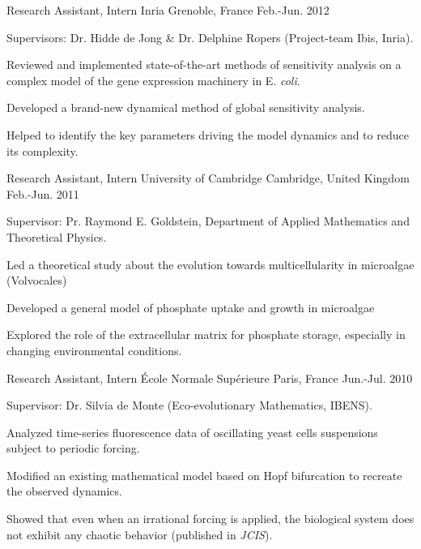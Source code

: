 
\begin{cventries}
  \cventry
    {Research Assistant, Intern} %
    {Inria} %
    {Grenoble, France} %
    {Feb.-Jun. 2012} %
    {
    Supervisors: Dr. Hidde de Jong \& Dr. Delphine Ropers (Project-team Ibis, Inria).
    \vspace{0.5cm}
	\begin{cvitems} %
		\item {Reviewed and implemented state-of-the-art methods of sensitivity analysis on a complex model of the gene expression machinery in E. \textit{coli}.}
		\item {Developed a brand-new dynamical method of global sensitivity analysis.}
		\item {Helped to identify the key parameters driving the model dynamics and to reduce its complexity.}
	\end{cvitems}
    }
    
  \cventry
    {Research Assistant, Intern} %
    {University of Cambridge} %
    {Cambridge, United Kingdom} %
    {Feb.-Jun. 2011} %
    {
	Supervisor: Pr. Raymond E. Goldstein, Department of Applied Mathematics and Theoretical Physics.
    \vspace{0.5cm}
	\begin{cvitems} %
		\item {Led a theoretical study about the evolution towards multicellularity in microalgae (Volvocales)}
		\item {Developed a general model of phosphate uptake and growth in microalgae}
		\item {Explored the role of the extracellular matrix for phosphate storage, especially in changing environmental conditions.}
	\end{cvitems}
    }
    
  \cventry
    {Research Assistant, Intern} %
    {École Normale Supérieure} %
    {Paris, France} %
    {Jun.-Jul. 2010} %
    {
	Supervisor: Dr. Silvia de Monte (Eco-evolutionary Mathematics, IBENS).
    \vspace{0.5cm}
	\begin{cvitems} %
		\item {Analyzed time-series fluorescence data of oscillating yeast cells suspensions subject to periodic forcing.}
		\item {Modified an existing mathematical model based on Hopf bifurcation to recreate the observed dynamics.}
		\item {Showed that even when an irrational forcing is applied, the biological system does not exhibit any chaotic behavior (published in \textit{JCIS}).}
	\end{cvitems}
    }

\end{cventries}
